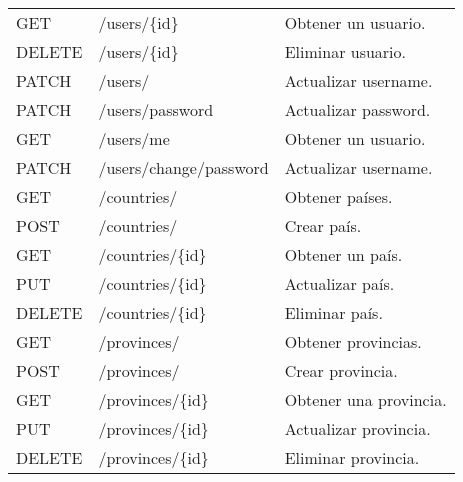 \begin{table}[H]
\begin{tabular}{l l l}
        GET             & /users/\{id\}          & Obtener un usuario.         \\
        DELETE          & /users/\{id\}          & Eliminar usuario.           \\
        PATCH           & /users/                & Actualizar username.        \\
        PATCH           & /users/password        & Actualizar password.        \\
        GET             & /users/me              & Obtener un usuario.         \\
        PATCH           & /users/change/password & Actualizar username.        \\

        \midrule
        GET             & /countries/            & Obtener países.             \\
        POST            & /countries/            & Crear país.                 \\
        GET             & /countries/\{id\}      & Obtener un país.            \\
        PUT             & /countries/\{id\}      & Actualizar país.            \\
        DELETE          & /countries/\{id\}      & Eliminar país.              \\
        \midrule
        GET             & /provinces/            & Obtener provincias.         \\
        POST            & /provinces/            & Crear provincia.            \\
        GET             & /provinces/\{id\}      & Obtener una provincia.      \\
        PUT             & /provinces/\{id\}      & Actualizar provincia.       \\
        DELETE          & /provinces/\{id\}      & Eliminar provincia.         \\
        \bottomrule
        \hline
    \end{tabular}
    \label{tab:endpoints1}
\end{table}

